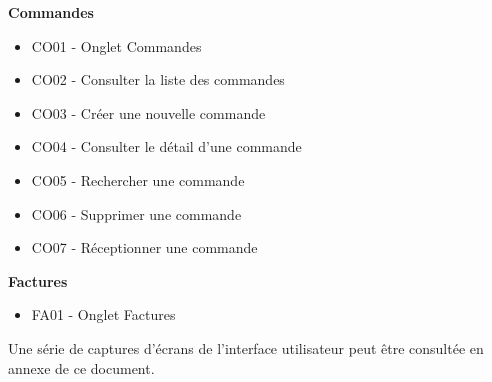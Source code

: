 \newpara
\textbf{Commandes}
\begin{itemize}
  \item \checkmark CO01 - Onglet Commandes
  \item \checkmark CO02 - Consulter la liste des commandes
  \item \checkmark CO03 - Créer une nouvelle commande
  \item \checkmark CO04 - Consulter le détail d'une commande
  \item \checkmark CO05 - Rechercher une commande
  \item \checkmark CO06 - Supprimer une commande
  \item \checkmark CO07 - Réceptionner une commande
\end{itemize}

\newpara
\textbf{Factures}
\begin{itemize}
  \item \checkmark FA01 - Onglet Factures
\end{itemize}

\newpara
Une série de captures d'écrans de l'interface utilisateur peut être consultée en annexe de ce document.